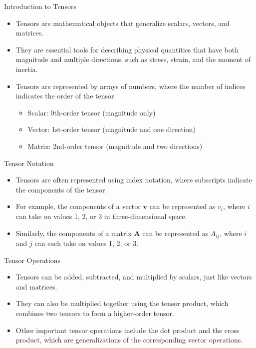 \documentclass{beamer}
\begin{document}
\begin{frame}{Introduction to Tensors}
    \begin{itemize}
        \item Tensors are mathematical objects that generalize scalars, vectors, and matrices.
        \item They are essential tools for describing physical quantities that have both magnitude and multiple directions, such as stress, strain, and the moment of inertia.
        \item Tensors are represented by arrays of numbers, where the number of indices indicates the order of the tensor.
        \begin{itemize}
            \item Scalar: 0th-order tensor (magnitude only)
            \item Vector: 1st-order tensor (magnitude and one direction)
            \item Matrix: 2nd-order tensor (magnitude and two directions)
        \end{itemize}
    \end{itemize}
\end{frame}

\begin{frame}{Tensor Notation}
    \begin{itemize}
        \item Tensors are often represented using index notation, where subscripts indicate the components of the tensor.
        \item For example, the components of a vector $\mathbf{v}$ can be represented as $v_i$, where $i$ can take on values 1, 2, or 3 in three-dimensional space.
        \item Similarly, the components of a matrix $\mathbf{A}$ can be represented as $A_{ij}$, where $i$ and $j$ can each take on values 1, 2, or 3.
    \end{itemize}
\end{frame}

\begin{frame}{Tensor Operations}
    \begin{itemize}
        \item Tensors can be added, subtracted, and multiplied by scalars, just like vectors and matrices.
        \item They can also be multiplied together using the tensor product, which combines two tensors to form a higher-order tensor.
        \item Other important tensor operations include the dot product and the cross product, which are generalizations of the corresponding vector operations.
    \end{itemize}
\end{frame}
\end{document}

